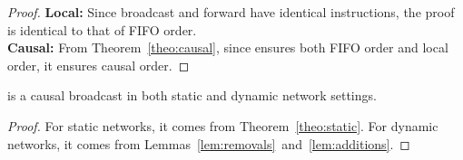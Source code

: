 \begin{proof}
  \textbf{Local:} Since broadcast and forward have identical instructions, the
  proof is identical to that of FIFO order. \\
  \textbf{Causal:} From Theorem~\ref{theo:causal}, since \CBROADCAST ensures
  both FIFO order and local order, it ensures causal order.
\end{proof}

\begin{theorem}
  \CBROADCAST is a causal broadcast in both static and dynamic network settings.
\end{theorem}

\begin{proof}
  For static networks, it comes from Theorem~\ref{theo:static}. For dynamic
  networks, it comes from Lemmas~\ref{lem:removals}~and~\ref{lem:additions}.
\end{proof}

